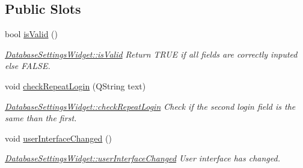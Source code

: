 \subsection*{Public Slots}
\begin{DoxyCompactItemize}
\item 
bool \hyperlink{classGui_1_1Widgets_1_1DatabaseSettingsWidget_a8b7f1184a885ca63edce7957b74751c6}{is\-Valid} ()
\begin{DoxyCompactList}\small\item\em \hyperlink{classGui_1_1Widgets_1_1DatabaseSettingsWidget_a8b7f1184a885ca63edce7957b74751c6}{Database\-Settings\-Widget\-::is\-Valid} Return T\-R\-U\-E if all fields are correctly inputed else F\-A\-L\-S\-E. \end{DoxyCompactList}\item 
\hypertarget{classGui_1_1Widgets_1_1DatabaseSettingsWidget_a42909f8a25f7e75685f1b02d811fd6eb}{void \hyperlink{classGui_1_1Widgets_1_1DatabaseSettingsWidget_a42909f8a25f7e75685f1b02d811fd6eb}{check\-Repeat\-Login} (Q\-String text)}\label{classGui_1_1Widgets_1_1DatabaseSettingsWidget_a42909f8a25f7e75685f1b02d811fd6eb}

\begin{DoxyCompactList}\small\item\em \hyperlink{classGui_1_1Widgets_1_1DatabaseSettingsWidget_a42909f8a25f7e75685f1b02d811fd6eb}{Database\-Settings\-Widget\-::check\-Repeat\-Login} Check if the second login field is the same than the first. \end{DoxyCompactList}\item 
\hypertarget{classGui_1_1Widgets_1_1DatabaseSettingsWidget_a063c346b830524fb1f96f32984fb5493}{void \hyperlink{classGui_1_1Widgets_1_1DatabaseSettingsWidget_a063c346b830524fb1f96f32984fb5493}{user\-Interface\-Changed} ()}\label{classGui_1_1Widgets_1_1DatabaseSettingsWidget_a063c346b830524fb1f96f32984fb5493}

\begin{DoxyCompactList}\small\item\em \hyperlink{classGui_1_1Widgets_1_1DatabaseSettingsWidget_a063c346b830524fb1f96f32984fb5493}{Database\-Settings\-Widget\-::user\-Interface\-Changed} User interface has changed. \end{DoxyCompactList}\end{DoxyCompactItemize}
